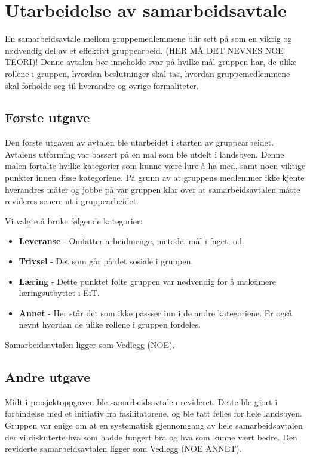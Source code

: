 \section{Utarbeidelse av samarbeidsavtale}
En samarbeidsavtale mellom gruppemedlemmene blir sett på som en viktig og nødvendig del av et effektivt gruppearbeid. 
(HER MÅ DET NEVNES NOE TEORI)!
Denne avtalen bør inneholde svar på hvilke mål gruppen har, de ulike rollene i gruppen, hvordan beslutninger skal tas, hvordan gruppemedlemmene skal forholde seg til hverandre og øvrige formaliteter. 

\subsection{Første utgave}
Den første utgaven av avtalen ble utarbeidet i starten av gruppearbeidet. 
Avtalens utforming var bassert på en mal som ble utdelt i landsbyen. 
Denne malen fortalte hvilke kategorier som kunne være lure å ha med, samt noen viktige punkter innen disse kategoriene. 
På grunn av at gruppens medlemmer ikke kjente hverandres måter og jobbe på var gruppen klar over at samarbeidsavtalen måtte revideres senere ut i gruppearbeidet. 
\vspace{\secspace}

Vi valgte å bruke følgende kategorier:
\begin{itemize}
    \item \textbf{Leveranse} - Omfatter arbeidmenge, metode, mål i faget, o.l.
    \item \textbf{Trivsel} - Det som går på det sosiale i gruppen. 
    \item \textbf{Læring} - Dette punktet følte gruppen var nødvendig for å maksimere læringsutbyttet i EiT. 
    \item \textbf{Annet} - Her står det som ikke passser inn i de andre kategoriene. Er også nevnt hvordan de ulike rollene i gruppen fordeles. 
\end{itemize}
Samarbeidsavtalen ligger som Vedlegg (NOE). 

\subsection{Andre utgave}
Midt i prosjektoppgaven ble samarbeidsavtalen revideret. 
Dette ble gjort i forbindelse med et initiativ fra fasilitatorene, og ble tatt felles for hele landsbyen. 
Gruppen var enige om at en systematisk gjennomgang av hele samarbeidsavtalen der vi diskuterte hva som hadde fungert bra og hva som kunne vært bedre. 
\vspace{\secspace}
Den reviderte samarbeidsavtalen ligger som Vedlegg (NOE ANNET).  
